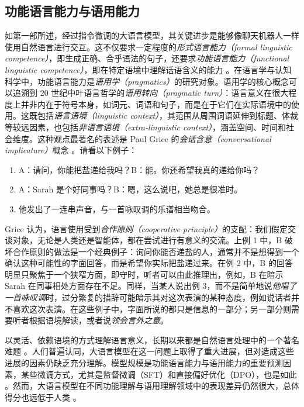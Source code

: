 \subsection{功能语言能力与语用能力}
如第一部所述，经过指令微调的大语言模型，其关键进步是能够像聊天机器人一样使用自然语言进行交互。这不仅要求一定程度的\emph{形式语言能力（formal linguistic competence）}，即生成正确、合乎语法的句子，还要求\emph{功能语言能力（functional linguistic competence）}，即在特定语境中理解话语含义的能力 \citep{mahowald2023dissociating}。在语言学与认知科学中，功能语言能力是{\em 语用学（pragmatics）}的研究对象。语用学的核心概念可以追溯到 20 世纪中叶语言哲学的{\em 语用转向（pragmatic turn）}：语言意义在很大程度上并非内在于符号本身，如词元、词语和句子，而是在于它们在实际语境中的使用。这既包括\emph{语言语境（linguistic context）}，其范围从周围词语延伸到标题、体裁等较远因素，也包括\emph{非语言语境（extra-linguistic context）}，涵盖空间、时间和社会维度。这种观点最著名的表述是 Paul Grice 的\emph{会话含意（conversational implicature）}概念 \citep{Grice_1975}。请看以下例子：

\begin{enumerate}
    \item A：请问，你能把盐递给我吗？B：能。你还希望我真的递给你吗？
    \item A：Sarah 是个好同事吗？B：嗯，这么说吧，她总是很准时。
    \item 他发出了一连串声音，与一首咏叹调的乐谱相当吻合。
\end{enumerate}
Grice 认为，语言使用受到\emph{合作原则（cooperative principle）}的支配：我们假定交谈对象，无论是人类还是智能体，都在尝试进行有意义的交流。上例 1 中，B 破坏合作原则的做法是一个经典例子：询问你能否递盐的人，通常并不是想得到一个确认这种可能性的字面回答，而是希望你实际把盐递过来。在例 2 中，B 的回答明显只聚焦于一个狭窄方面，即守时，听者可以由此推理出，例如，B 在暗示 Sarah 在同事相处方面存在不足。同样，当某人说出例 3，而不是简单地说{\em 他唱了一首咏叹调}时，过分繁复的措辞可能暗示其对这次表演的某种态度，例如说话者并不喜欢这次表演。在这些例子中，字面所说的都只是信息的一部分；另一部分则需要听者根据语境解读，或者说{\em 领会言外之意}。

以灵活、依赖语境的方式理解语言意义，长期以来都是自然语言处理中的一个著名难题 \citep{trott-etal-2020-construing}。人们普遍认同，大语言模型在这一问题上取得了重大进展，但对造成这些进展的因素仍缺乏充分理解。模型规模是功能语言能力与语用能力的重要预测因素，某些微调方式，尤其是监督微调（SFT）和直接偏好优化（DPO），也是如此 \citep{yu-etal-2026-pragmatic, ruis2023goldilocks}。然而，大语言模型在不同功能理解与语用理解领域中的表现差异仍然很大，总体得分也远低于人类 \citep{sravanthi2024-pub}。

